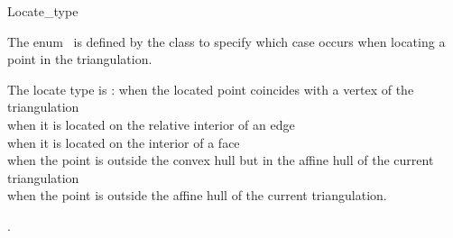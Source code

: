 
\ccModifierCrossRefOff
\begin{ccRefEnum}{Locate_type}  %


\ccDefinition
  
The enum \ccRefName\ is defined by the
class to specify
which case occurs when locating a point in the triangulation. 

{The locate type is :
 when the located point coincides 
with a vertex of the triangulation \\
 when it is located on the relative interior of an edge \\
 when it is located on the interior of a face  \\
 when the point
is  outside the convex hull but in the affine hull of the current triangulation \\
when the point is outside the affine hull
of the current triangulation.}

\ccSeeAlso
{}.

\end{ccRefEnum}
\ccModifierCrossRefOn





